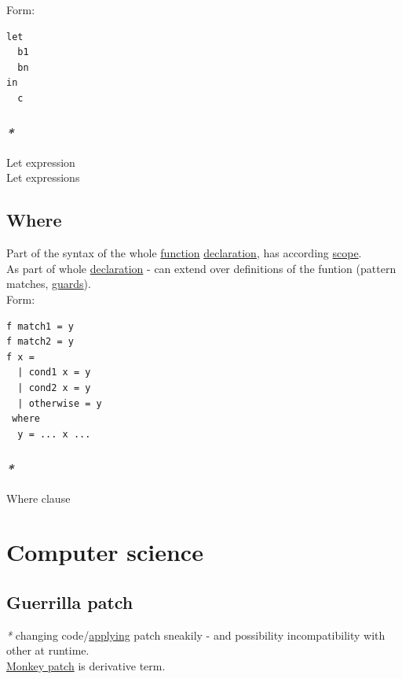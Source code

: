 \documentclass[a4paper,14pt,oneside]{book}
\begin{document}
Form:\\
\begin{verbatim}
let
  b1
  bn
in
  c
\end{verbatim}

\subsection{\emph{*}}
\label{sec:org80dfd3f}

\label{orgca6eb51}Let expression\\
\label{org22d98ea}Let expressions\\

\section{\label{org1a56575}Where}
\label{sec:org59420b6}
Part of the syntax of the whole \hyperref[orge00b05b]{function} \hyperref[org818234c]{declaration}, has according \hyperref[orgb1019a6]{scope}.\\

As part of whole \hyperref[org818234c]{declaration} - can extend over definitions of the funtion (pattern matches, \hyperref[org72799ec]{guards}).\\

Form:\\
\begin{verbatim}
f match1 = y
f match2 = y
f x =
  | cond1 x = y
  | cond2 x = y
  | otherwise = y
 where
  y = ... x ...
\end{verbatim}

\subsection{\emph{*}}
\label{sec:org3cff26a}

\label{orgb9ca893}Where clause\\

\chapter{Computer science}
\label{sec:org394c257}
\section{\label{orgd778ba6}Guerrilla patch}
\label{sec:orgb7f2f62}
\emph{*} changing code/\hyperref[org8ff03cd]{applying} patch sneakily - and possibility incompatibility with other at runtime.\\
\hyperref[orgbe496df]{Monkey patch} is derivative term.\\
\end{document}
